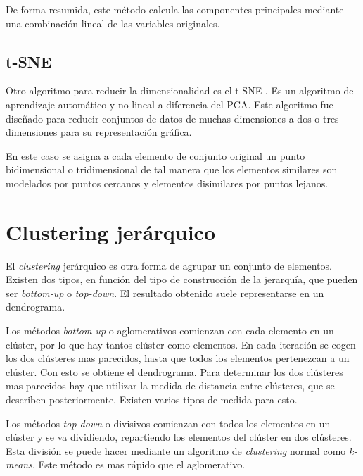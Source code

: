 De forma resumida, este método calcula las componentes principales mediante una combinación lineal de las variables originales.

\subsection{t-SNE}
Otro algoritmo para reducir la dimensionalidad es el t-SNE \cite{wiki:TSNE}. Es un algoritmo de aprendizaje automático y no lineal a diferencia del PCA. Este algoritmo fue diseñado para reducir conjuntos de datos de muchas dimensiones a dos o tres dimensiones para su representación gráfica.

En este caso se asigna a cada elemento de conjunto original un punto bidimensional o tridimensional de tal manera que los elementos similares son modelados por puntos cercanos y elementos disimilares por puntos lejanos.

\section{Clustering jerárquico}
El \emph{clustering} jerárquico \cite{hierarchical} es otra forma de agrupar un conjunto de elementos. Existen dos tipos, en función del tipo de construcción de la jerarquía, que pueden ser \emph{bottom-up} o \emph{top-down}. El resultado obtenido suele representarse en un dendrograma.

Los métodos \emph{bottom-up} o aglomerativos comienzan con cada elemento en un clúster, por lo que hay tantos clúster como elementos. En cada iteración se cogen los dos clústeres mas parecidos, hasta que todos los elementos pertenezcan a un clúster. Con esto se obtiene el dendrograma. Para determinar los dos clústeres mas parecidos hay que utilizar la medida de distancia entre clústeres, que se describen posteriormente. Existen varios tipos de medida para esto.

Los métodos \emph{top-down} o divisivos comienzan con todos los elementos en un clúster y se va dividiendo, repartiendo los elementos del clúster en dos clústeres. Esta división se puede hacer mediante un algoritmo de \emph{clustering} normal como \emph{k-means}. Este método es mas rápido que el aglomerativo.

